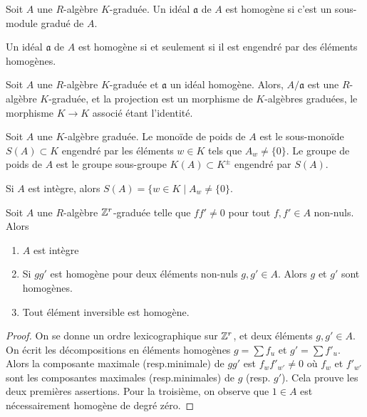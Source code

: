 \begin{defn}
Soit $A$ une $R$-algèbre $K$-graduée. Un idéal $\mathfrak{a}$ de $A$ est homogène si c'est un sous-module gradué de $A$.
\end{defn}

\begin{prop}
Un idéal $\mathfrak{a}$ de $A$ est homogène si et seulement si il est engendré par des éléments homogènes.
\end{prop}

\begin{rem}
Soit $A$ une $R$-algèbre $K$-graduée et $\mathfrak{a}$ un idéal homogène. Alors, $A/\mathfrak{a}$ est une $R$-algèbre $K$-graduée, et la projection est un morphisme de $K$-algèbres graduées, le morphisme $K\rightarrow K$ associé étant l'identité.
\end{rem}

\begin{defn}
Soit $A$ une $K$-algèbre graduée. Le monoïde de poids de $A$ est le sous-monoïde $S(A)\subset K$ engendré par les éléments $w\in K$ tels que $A_w\neq \lbrace 0 \rbrace$. Le groupe de poids de $A$ est le groupe sous-groupe $K(A)\subset K^{\pm}$ engendré par $S(A)$.
\end{defn}

\begin{rem}
Si $A$ est intègre, alors $S(A)=\lbrace w\in K\mid A_w\neq \lbrace 0\rbrace$.
\end{rem}

\begin{prop}
Soit $A$ une $R$-algèbre $\mathbb{Z}^r$-graduée telle que $ff'\neq 0$ pour tout $f,f'\in A$ non-nuls. Alors
\begin{enumerate}
\item $A$ est intègre
\item Si $gg'$ est homogène pour deux éléments non-nuls $g,g'\in A$. Alors $g$ et $g'$ sont homogènes.
\item Tout élément inversible est homogène.
\end{enumerate}
\end{prop}
\begin{proof}
On se donne un ordre lexicographique sur $\mathbb{Z}^r$, et deux éléments $g,g'\in A$. On écrit les décompositions en éléments homogènes $g=\sum f_u$ et $g'=\sum f'_u$. Alors la composante maximale (resp.minimale) de $gg'$ est $f_wf'_{w'}\neq 0$ où $f_w$ et $f'_{w'}$ sont les composantes maximales (resp.minimales) de $g$ (resp. $g'$). Cela prouve les deux premières assertions. Pour la troisième, on observe que $1\in A$ est nécessairement homogène de degré zéro.
\end{proof}



